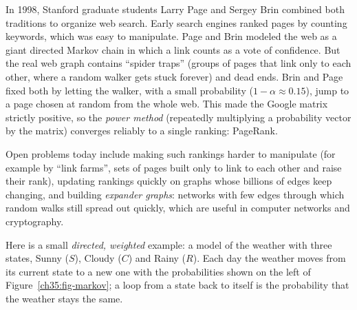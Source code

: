 \begin{historybox}
In 1998, Stanford graduate students Larry Page and Sergey Brin combined both traditions to
organize web search. Early search engines ranked pages by counting keywords, which was easy
to manipulate. Page and Brin modeled the web as a giant directed Markov chain in which a
link counts as a vote of confidence. But the real web graph contains ``spider traps''
(groups of pages that link only to each other, where a random walker gets stuck forever)
and dead ends. Brin and Page fixed both by letting the walker, with a small probability
($1-\alpha \approx 0.15$), jump to a page chosen at random from the whole web. This made the
Google matrix strictly positive, so the \emph{power method} (repeatedly multiplying a
probability vector by the matrix) converges reliably to a single ranking: PageRank.

Open problems today include making such rankings harder to manipulate (for example by
``link farms'', sets of pages built only to link to each other and raise their rank),
updating rankings quickly on graphs whose billions of edges keep changing, and building
\emph{expander graphs}: networks with few edges through which random walks still spread out
quickly, which are useful in computer networks and cryptography.
\end{historybox}

Here is a small \emph{directed, weighted} example: a model of the weather with three states,
Sunny ($S$), Cloudy ($C$) and Rainy ($R$). Each day the weather moves from its current state
to a new one with the probabilities shown on the left of Figure~\ref{ch35:fig-markov}; a loop
from a state back to itself is the probability that the weather stays the same.

